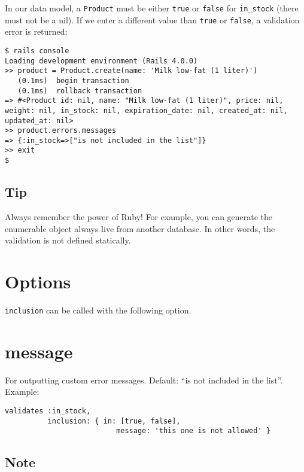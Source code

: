 \documentclass[a4paper]{book}
\newcounter{tab}[chapter]
\begin{document}
In our data model, a \texttt{Product} must be either \texttt{true} or \texttt{false} for \texttt{in\_stock} (there must not be a nil). If we enter a different value than \texttt{true} or \texttt{false}, a validation error is returned:

\begin{shaded}\begin{verbatim}
$ rails console
Loading development environment (Rails 4.0.0)
>> product = Product.create(name: 'Milk low-fat (1 liter)')
   (0.1ms)  begin transaction
   (0.1ms)  rollback transaction
=> #<Product id: nil, name: "Milk low-fat (1 liter)", price: nil, weight: nil, in_stock: nil, expiration_date: nil, created_at: nil, updated_at: nil>
>> product.errors.messages
=> {:in_stock=>["is not included in the list"]}
>> exit
$
\end{verbatim}\end{shaded}

\subsection{Tip}\label{tip-11}

Always remember the power of Ruby! For example, you can generate the enumerable object always live from another database. In other words, the validation is not defined statically.

\section{Options}\label{options-6}

\texttt{inclusion} can be called with the following option.

\section{message}\label{message}

For outputting custom error messages. Default: “is not included in the list”. Example:

\begin{shaded}\begin{verbatim}
validates :in_stock,
          inclusion: { in: [true, false],
                          message: 'this one is not allowed' }
\end{verbatim}\end{shaded}

\subsection{Note}\label{note-29}
\end{document}
